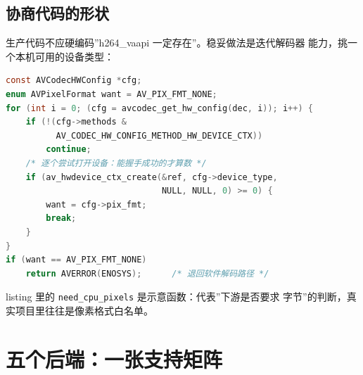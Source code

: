 \documentclass[12pt,a4paper,fontset=fandol]{ctexbook}
\begin{document}
\subsection*{协商代码的形状}

生产代码不应硬编码''h264\_vaapi 一定存在''。稳妥做法是迭代解码器
能力，挑一个本机可用的设备类型：

\begin{lstlisting}[style=cstyle,language=C,
  caption={迭代 \#avcodec-get-hw-config 挑选可用后端},
  label={lst:ch08-negotiate}]
const AVCodecHWConfig *cfg;
enum AVPixelFormat want = AV_PIX_FMT_NONE;
for (int i = 0; (cfg = avcodec_get_hw_config(dec, i)); i++) {
    if (!(cfg->methods &
          AV_CODEC_HW_CONFIG_METHOD_HW_DEVICE_CTX))
        continue;
    /* 逐个尝试打开设备：能握手成功的才算数 */
    if (av_hwdevice_ctx_create(&ref, cfg->device_type,
                               NULL, NULL, 0) >= 0) {
        want = cfg->pix_fmt;
        break;
    }
}
if (want == AV_PIX_FMT_NONE)
    return AVERROR(ENOSYS);      /* 退回软件解码路径 */
\end{lstlisting}

listing 里的 \verb|need_cpu_pixels| 是示意函数：代表''下游是否要求
字节''的判断，真实项目里往往是像素格式白名单。

\section{五个后端：一张支持矩阵}
\end{document}
